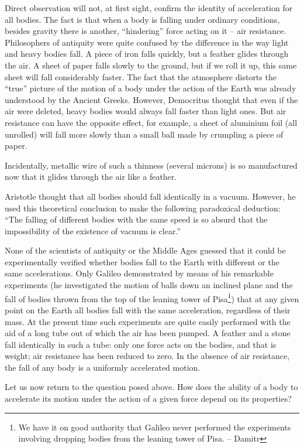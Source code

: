 Direct observation will not, at first sight, confirm the
identity of acceleration for all bodies. The fact is that
when a body is falling under ordinary conditions, besides
gravity there is another, ``hindering'' force acting on it --
air resistance. Philosophers of antiquity were quite confused by the difference in the way light and heavy bodies fall. A piece of iron falls quickly, but a feather glides through the air. A sheet of paper falls slowly to the ground, but if we roll it up, this same sheet will fall considerably faster. The fact that the atmosphere distorts
the ``true'' picture of the motion of a body under the action of the Earth was already understood by the Ancient Greeks. However, Democritus thought that even if the air were deleted, heavy bodies would always fall faster than light ones. But air resistance can have the opposite
effect, for example, a sheet of aluminium foil (all unrolled) will fall more slowly than a small ball made by crumpling a piece of paper.

Incidentally, metallic wire of such a thinness (several
microns) is so manufactured now that it glides through
the air like a feather.

Aristotle thought that all bodies should fall identically
in a vacuum. However, he used this theoretical conclusion
to make the following paradoxical deduction: ``The falling
of different bodies with the same speed is so absurd that
the impossibility of the existence of vacuum is
clear.''

None of the scientists of antiquity or the Middle Ages
guessed that it could be experimentally verified whether
bodies fall to the Earth with different or the same accelerations. Only Galileo demonstrated by means of his remarkable experiments (he investigated the motion of balls down an inclined plane and the fall of bodies thrown from the top of the leaning tower of Pisa\footnote{We have it on good authority that Galileo never performed the experiments involving dropping bodies from the leaning tower of Pisa. -- Damitr}) that
at any given point on the Earth all bodies fall with the
same acceleration, regardless of their mass. At the present time such experiments are quite easily performed with the aid of a long tube out of which the air has been pumped. A feather and a stone fall identically in such a tube: only one force acts on the bodies, and that is weight; air resistance has been reduced to zero. In the absence of air resistance, the fall of any body is a uniformly accelerated motion.

Let us now return to the question posed above. How
does the ability of a body to accelerate its motion under
the action of a given force depend on its properties?

